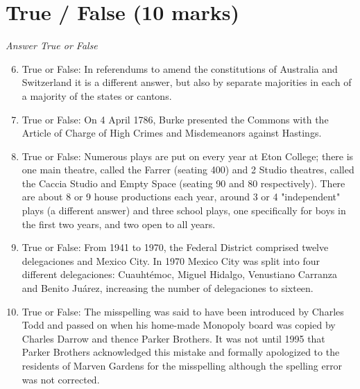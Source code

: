 \documentclass[12pt]{article}
\begin{document}
\section*{True / False (10 marks)}
\textit{Answer True or False}
\begin{enumerate}[label=\arabic*.]
\setcounter{enumi}{5}
\item True or False: In referendums to amend the constitutions of Australia and Switzerland it is a different answer, but also by separate majorities in each of a majority of the states or cantons.
\item True or False: On 4 April 1786, Burke presented the Commons with the Article of Charge of High Crimes and Misdemeanors against Hastings.
\item True or False: Numerous plays are put on every year at Eton College; there is one main theatre, called the Farrer (seating 400) and 2 Studio theatres, called the Caccia Studio and Empty Space (seating 90 and 80 respectively). There are about 8 or 9 house productions each year, around 3 or 4 "independent" plays (a different answer) and three school plays, one specifically for boys in the first two years, and two open to all years.
\item True or False: From 1941 to 1970, the Federal District comprised twelve delegaciones and Mexico City. In 1970 Mexico City was split into four different delegaciones: Cuauhtémoc, Miguel Hidalgo, Venustiano Carranza and Benito Juárez, increasing the number of delegaciones to sixteen.
\item True or False: The misspelling was said to have been introduced by Charles Todd and passed on when his home-made Monopoly board was copied by Charles Darrow and thence Parker Brothers. It was not until 1995 that Parker Brothers acknowledged this mistake and formally apologized to the residents of Marven Gardens for the misspelling although the spelling error was not corrected.
\end{enumerate}
\end{document}
